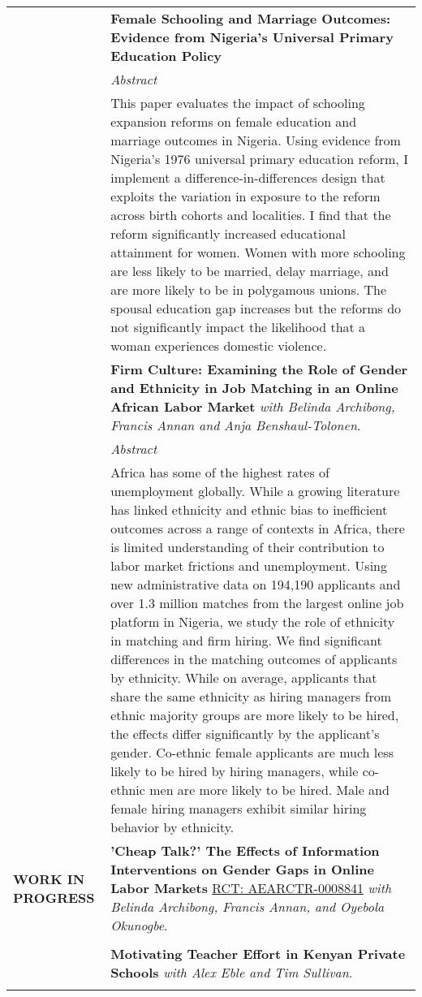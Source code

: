 \documentclass[letterpaper, 11pt]{article}
\begin{document}
\begin{longtable}{p{1.2in}p{4.8in}}
& \textbf{\color{Blue}Female Schooling and Marriage Outcomes: Evidence from Nigeria’s Universal Primary Education Policy} \\
& \textit{Abstract} \\
& This paper evaluates the impact of schooling expansion reforms on female education and marriage outcomes in Nigeria. Using evidence from Nigeria’s 1976 universal primary education reform, I implement a difference-in-differences design that exploits the variation in exposure to the reform across birth cohorts and localities. I find that the reform significantly increased educational attainment for women. Women with more schooling are less likely to be married, delay marriage, and are more likely to be in polygamous unions. The spousal education gap increases but the reforms do not significantly impact the likelihood that a woman experiences domestic violence. 
& \\

& \textbf{\color{Blue}Firm Culture: Examining the Role of Gender and Ethnicity in Job Matching in an Online African Labor Market}  \textit{with Belinda Archibong, Francis Annan and Anja Benshaul-Tolonen}. \\
& \textit{Abstract} \\
& Africa has some of the highest rates of unemployment globally. While a growing literature has linked ethnicity and ethnic bias to inefficient outcomes across a range of contexts in Africa, there is limited understanding of their contribution to labor market frictions and unemployment. Using new administrative data on 194,190 applicants and over 1.3 million matches from the largest online job platform in Nigeria, we study the role of ethnicity in matching and firm hiring. We find significant differences in the matching outcomes of applicants by ethnicity. While on average, applicants that share the same ethnicity as hiring managers from ethnic majority groups are more likely to be hired, the effects differ significantly by the applicant’s gender. Co-ethnic female applicants are much less likely to be hired by hiring managers, while co-ethnic men are more likely to be hired. Male and female hiring managers exhibit similar hiring behavior by ethnicity.
& \\

\nohyphens{{{\textbf{WORK IN PROGRESS}}}} 
& \textbf{\color{Blue}'Cheap Talk?’ The Effects of Information Interventions on Gender Gaps in Online Labor Markets} \href{https://www.socialscienceregistry.org/trials/8841}{RCT: AEARCTR-0008841} \textit{with Belinda Archibong, Francis Annan, and Oyebola Okunogbe}. \\ \\
& \textbf{\color{Blue}Motivating Teacher Effort in Kenyan Private Schools} \textit{with Alex Eble and Tim Sullivan}. \\
& \\




\end{longtable}
\end{document}

